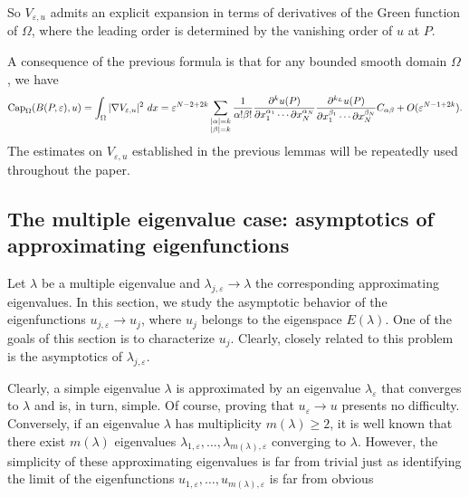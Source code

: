 \documentclass[11pt,reqno]{article}
\numberwithin{equation}{section}
\newcommand\e\varepsilon
\newcommand\la\lambda
\renewcommand\O\Omega
\begin{document}
 So $V_{\varepsilon,u}$ admits an explicit expansion in terms of derivatives of the Green function of $\Omega$, where the leading order is determined by the vanishing order of $u$ at $P$.

A consequence of the previous formula is that for any bounded smooth domain $\O$, we have
$$
    \hbox{Cap}_\O(B(P,\e),u)=\int_\O|\nabla V_{\e,u}|^2\ dx=\e^{N-2+2{ k}}\sum_{\substack{|\alpha|={ k}\\
           |\beta|={ k}}}\frac{1}{\alpha!\beta!}\frac{\partial^{{ k}} u (P)}{\partial x_{1}^{\alpha_1}\cdots\partial x_{N}^{\alpha_N}}\frac{\partial^{{ k_L}} u (P)}{\partial x_{1}^{\beta_1}\cdots\partial x_{N}^{\beta_N}}C_{\alpha\beta}+O(\e^{N-1+2{ k}}).
    $$
The estimates on $V_{\e,u}$ established in the previous lemmas will be repeatedly used throughout the paper.
            
  \subsection{The multiple eigenvalue case: asymptotics of approximating eigenfunctions}\label{is1}

Let $\lambda$ be a multiple eigenvalue and $\lambda_{j,\varepsilon}\to\lambda$ the corresponding approximating eigenvalues. In this section, we study the asymptotic behavior of the eigenfunctions $u_{j,\varepsilon}\to u_j$, where $u_j$ belongs to the eigenspace $E(\lambda)$. One of the goals of this section is to characterize $u_j$. Clearly, closely related to this problem is the asymptotics of $\lambda_{j,\varepsilon}$.

Clearly, a simple eigenvalue $\la$ is approximated by an eigenvalue $\la_\e$ that converges to $\la$ and is, in turn, simple. Of course, proving that $u_\varepsilon \to u$ presents no difficulty.
Conversely, if an eigenvalue $\la$ has multiplicity $m(\la)\ge2$, it is well known that there exist $m(\la)$ eigenvalues $\la_{1,\e}, \dots, \la_{m(\la),\e}$ converging to $\la$. However, the simplicity of these approximating eigenvalues is far from trivial just as identifying the limit of the eigenfunctions $u_{1,\e}, \dots, u_{m(\la),\e}$ is far from obvious
\end{document}
